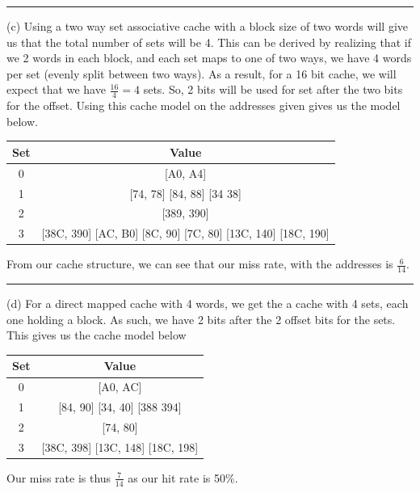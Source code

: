 \documentclass[12pt, letter]{article}
\begin{document}
	\hrule
	(c) Using a two way set associative cache with a block size of two words will give us that the total number of sets will be 4. This can be derived by realizing that if we 2 words in each block, and each set maps to one of two ways, we have 4 words per set (evenly split between two ways). As a result, for a 16 bit cache, we will expect that we have $\frac{16}{4} = 4$ sets. So, 2 bits will be used for set after the two bits for the offset. Using this cache model on the addresses given gives us the model below.
	 \newpage
	\begin{table}[h]
		\begin{center}
			\begin{tabular}{c | c}
				Set & Value\\
				\hline\hline
				0 & [A0, A4]\\
				\hline
				1 & [74, 78] [84, 88] [34 38]\\
				\hline
				2 & [389, 390]\\
				\hline
				3 & [38C, 390] [AC, B0] [8C, 90] [7C, 80] [13C, 140] [18C, 190]\\
				\hline
			\end{tabular}
		\end{center}
	\end{table}
	
	From our cache structure, we can see that our miss rate, with the addresses is $\frac{6}{14}$.
	\hrule
	
	(d) For a direct mapped cache with 4 words, we get the a cache with 4 sets, each one holding a block. As such, we have 2 bits after the 2 offset bits for the sets. This gives us the cache model below
	
	\begin{table}[h]
		\begin{center}
			\begin{tabular}{c | c}
				Set & Value\\
				\hline\hline
				0 & [A0, AC]\\
				\hline
				1 & [84, 90] [34, 40] [388 394]\\
				\hline
				2 & [74, 80]\\
				\hline
				3 & [38C, 398] [13C, 148] [18C, 198]\\
				\hline
			\end{tabular}
		\end{center}
	\end{table}
	
	Our miss rate is thus $\frac{7}{14}$ as our hit rate is 50\%.
	
\end{document}
